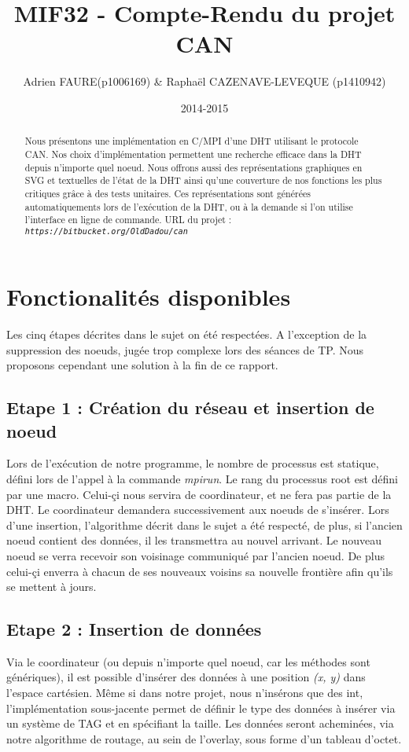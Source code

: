\documentclass[a4paper, 11pt, french]{article}
\title{\textbf{MIF32 - Compte-Rendu du projet CAN}}
\author{Adrien FAURE(p1006169) \& Raphaël CAZENAVE-LEVEQUE (p1410942)}
\date{2014-2015}
\begin{document}
    \maketitle

\begin{abstract}
Nous présentons une implémentation en C/MPI d'une DHT utilisant le protocole CAN. Nos choix d'implémentation permettent une recherche efficace dans la DHT depuis n'importe quel noeud. Nous offrons aussi des représentations graphiques en SVG et textuelles de l'état de la DHT ainsi qu'une couverture de nos fonctions les plus critiques grâce à des tests unitaires. Ces représentations sont générées automatiquements lors de l'exécution de la DHT, ou à la demande si l'on utilise l'interface en ligne de commande.
URL du projet : \textit{\texttt{https://bitbucket.org/OldDadou/can}}
\end{abstract}
\section{Fonctionalités disponibles}
Les cinq étapes décrites dans le sujet on été respectées. A l'exception de la suppression des noeuds, jugée trop complexe lors des séances de TP. Nous proposons cependant une solution à la fin de ce rapport.
\subsection{Etape 1 : Création du réseau et insertion de noeud}
Lors de l'exécution de notre programme, le nombre de processus est statique, défini lors de l'appel à la commande \textit{mpirun}. Le rang du processus root est défini par une macro. Celui-çi nous servira de coordinateur, et ne fera pas partie de la DHT. Le coordinateur demandera successivement aux noeuds de s'insérer. Lors d'une insertion, l'algorithme décrit dans le sujet a été respecté, de plus, si l'ancien noeud contient des données, il les transmettra au nouvel arrivant. Le nouveau noeud se verra recevoir son voisinage communiqué par l'ancien noeud. De plus celui-çi enverra à chacun de ses nouveaux voisins sa nouvelle frontière afin qu'ils se mettent à jours.
\subsection{Etape 2 : Insertion de données}
Via le coordinateur (ou depuis n'importe quel noeud, car les méthodes sont génériques), il est possible d'insérer des données à une position \textit{(x, y)} dans l'espace cartésien. Même si dans notre projet, nous n'insérons que des int, l'implémentation sous-jacente permet de définir le type des données à insérer via un système de TAG et en spécifiant la taille. Les données seront acheminées, via notre algorithme de routage, au sein de l'overlay, sous forme d'un tableau d'octet.
\end{document}
